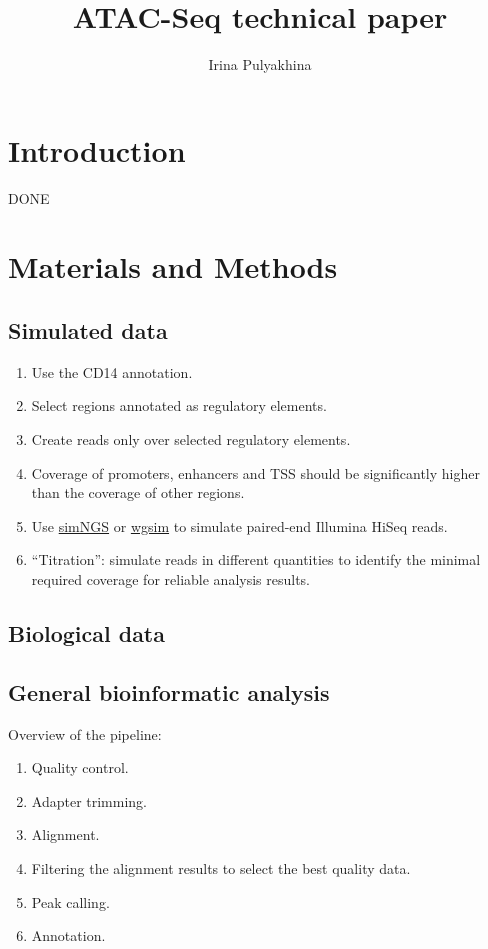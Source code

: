 \documentclass[11pt]{article}
\title{\textbf{ATAC-Seq technical paper}}
\author{Irina Pulyakhina}
\date{}
\begin{document}
\maketitle

\renewcommand\labelitemi{\tiny$\bullet$}

\section{Introduction}

DONE


\section{Materials and Methods}
\subsection{Simulated data}
\begin{enumerate}
\itemsep0em
  \item Use the CD14 annotation.
  \item Select regions annotated as regulatory elements.
  \item Create reads only over selected regulatory elements.
  \item Coverage of promoters, enhancers and TSS should be significantly
        higher than the coverage of other regions.
  \item Use \href{http://www.ebi.ac.uk/goldman-srv/simNGS/}{simNGS} or
        \href{http://samtools.sourceforge.net/}{wgsim} to simulate
        paired-end Illumina HiSeq reads.
  \item ``Titration'': simulate reads in different quantities to
        identify the minimal required coverage for reliable analysis
        results.
\end{enumerate}

\subsection{Biological data}

\subsection{General bioinformatic analysis} Overview of the pipeline:
\begin{enumerate}
\itemsep0em 
  \item Quality control.
  \item Adapter trimming.
  \item Alignment.
  \item Filtering the alignment results to select the best quality data. 
  \item Peak calling.
  \item Annotation.
\end{enumerate}
\end{document}
